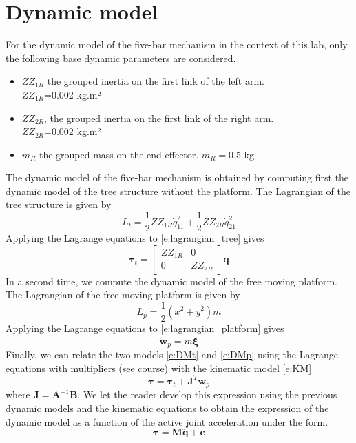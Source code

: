 \documentclass[a4paper]{article}
\begin{document}
\section{Dynamic model}
For the dynamic model of the five-bar mechanism in the context of this lab, only the following base dynamic parameters are considered.
\begin{itemize}
    \item $ZZ_{1R}$ the grouped inertia on the first link of the left arm. \\$ZZ_{1R}$=0.002 kg.m²
    \item $ZZ_{2R}$, the grouped inertia on the first link of the right arm. \\$ZZ_{2R}$=0.002 kg.m²
    \item $m_R$ the grouped mass on the end-effector. $m_R=0.5$ kg
\end{itemize}
The dynamic model of the five-bar mechanism is obtained by computing first the dynamic model of the tree structure without the platform. The Lagrangian of the tree structure is given by
%
\begin{equation}
    L_t = \frac{1}{2}ZZ_{1R}\dot{q}_{11}^2 + \frac{1}{2}ZZ_{2R}\dot{q}_{21}^2
    \label{e:lagrangian_tree}
\end{equation}
Applying the Lagrange equations to \eqref{e:lagrangian_tree} gives
%
\begin{equation}
    \boldsymbol{\tau}_t=\begin{bmatrix}
        ZZ_{1R} & 0\\
        0 & ZZ_{2R}
    \end{bmatrix}\ddot{\boldsymbol{q}}
    \label{e:DMt}
\end{equation}
%
In a second time, we compute the dynamic model of the free moving platform. The Lagrangian of the free-moving platform is given by
%
\begin{equation}
    L_p = \frac{1}{2}(\dot{x}^2+\dot{y}^2)m
    \label{e:lagrangian_platform}
\end{equation}
%
Applying the Lagrange equations to \eqref{e:lagrangian_platform} gives
%
\begin{equation}
    \mathbf{w}_p = m\ddot{\boldsymbol{\xi}}
    \label{e:DMp}
\end{equation}
%
Finally, we can relate the two models \eqref{e:DMt} and \eqref{e:DMp} using the Lagrange equations with multipliers (see course) with the kinematic model \eqref{e:KM}
\begin{equation}
    \boldsymbol{\tau} = \boldsymbol{\tau}_t + \mathbf{J}^T\mathbf{w}_p
\end{equation}
where $\mathbf{J}=\mathbf{A}^{-1}\mathbf{B}$. We let the reader develop this expression using the previous dynamic models and the kinematic equations to obtain the expression of the dynamic model as a function of the active joint acceleration under the form.
\begin{equation}
    \boldsymbol{\tau} = \mathbf{M}\ddot{\mathbf{q}} + \mathbf{c}
\end{equation}
\end{document}
